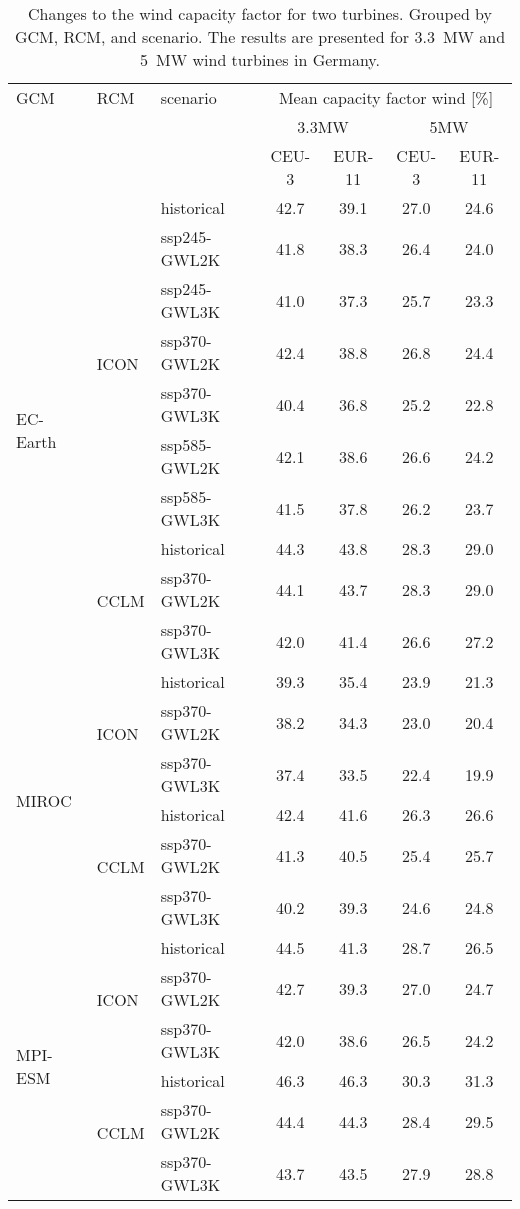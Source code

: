 \begin{table}[!htbp]
\centering
\caption{Changes to the wind capacity factor for two turbines. Grouped by GCM, RCM, and scenario. The results are presented for \qty{3.3}{\mega\watt} and \qty{5}{\mega\watt} wind turbines in Germany.}
\label{Table:CF_Wind_changes}
\begin{tabular}{lll|cc|cc}
\toprule
GCM & RCM & scenario & \multicolumn{4}{c}{Mean capacity factor wind [\%]} \\
 & & & \multicolumn{2}{c}{3.3\si{\mega\watt}} & \multicolumn{2}{c}{5\si{\mega\watt}} \\
 & & & CEU-3 & EUR-11 & CEU-3 & EUR-11 \\
\midrule
\cmidrule(lr){1-7}
\multirow{10}{*}{EC-Earth} & \multirow{7}{*}{ICON} & historical & 42.7 & 39.1 & 27.0 & 24.6 \\
 &  & ssp245-GWL2K & 41.8 & 38.3 & 26.4 & 24.0 \\
 &  & ssp245-GWL3K & 41.0 & 37.3 & 25.7 & 23.3 \\
 &  & ssp370-GWL2K & 42.4 & 38.8 & 26.8 & 24.4 \\
 &  & ssp370-GWL3K & 40.4 & 36.8 & 25.2 & 22.8 \\
 &  & ssp585-GWL2K & 42.1 & 38.6 & 26.6 & 24.2 \\
 &  & ssp585-GWL3K & 41.5 & 37.8 & 26.2 & 23.7 \\
\cmidrule(lr){2-7}
 & \multirow{3}{*}{CCLM} & historical & 44.3 & 43.8 & 28.3 & 29.0 \\
 &  & ssp370-GWL2K & 44.1 & 43.7 & 28.3 & 29.0 \\
 &  & ssp370-GWL3K & 42.0 & 41.4 & 26.6 & 27.2 \\
\cmidrule(lr){2-7}
\multirow{6}{*}{MIROC} & \multirow{3}{*}{ICON} & historical & 39.3 & 35.4 & 23.9 & 21.3 \\
 &  & ssp370-GWL2K & 38.2 & 34.3 & 23.0 & 20.4 \\
 &  & ssp370-GWL3K & 37.4 & 33.5 & 22.4 & 19.9 \\
\cmidrule(lr){2-7}
 & \multirow{3}{*}{CCLM} & historical & 42.4 & 41.6 & 26.3 & 26.6 \\
 &  & ssp370-GWL2K & 41.3 & 40.5 & 25.4 & 25.7 \\
 &  & ssp370-GWL3K & 40.2 & 39.3 & 24.6 & 24.8 \\
\cmidrule(lr){2-7}
\multirow{6}{*}{MPI-ESM} & \multirow{3}{*}{ICON} & historical & 44.5 & 41.3 & 28.7 & 26.5 \\
 &  & ssp370-GWL2K & 42.7 & 39.3 & 27.0 & 24.7 \\
 &  & ssp370-GWL3K & 42.0 & 38.6 & 26.5 & 24.2 \\
\cmidrule(lr){2-7}
 & \multirow{3}{*}{CCLM} & historical & 46.3 & 46.3 & 30.3 & 31.3 \\
 &  & ssp370-GWL2K & 44.4 & 44.3 & 28.4 & 29.5 \\
 &  & ssp370-GWL3K & 43.7 & 43.5 & 27.9 & 28.8 \\
\bottomrule
\end{tabular}
\end{table}
